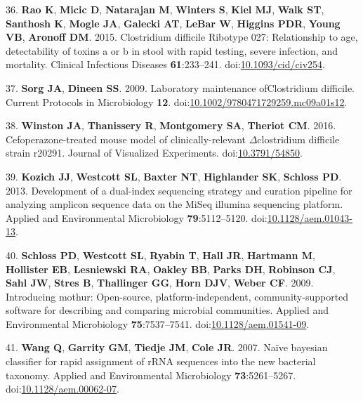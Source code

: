 \documentclass[11pt,]{article}
\newlength{\cslhangindent}
\newenvironment{cslreferences}%
  {\setlength{\parindent}{0pt}%
  \everypar{\setlength{\hangindent}{\cslhangindent}}\ignorespaces}%
  {\par}
\begin{document}
\begin{cslreferences}
\leavevmode\hypertarget{ref-rao2015}{}%
36. \textbf{Rao K}, \textbf{Micic D}, \textbf{Natarajan M},
\textbf{Winters S}, \textbf{Kiel MJ}, \textbf{Walk ST}, \textbf{Santhosh
K}, \textbf{Mogle JA}, \textbf{Galecki AT}, \textbf{LeBar W},
\textbf{Higgins PDR}, \textbf{Young VB}, \textbf{Aronoff DM}. 2015.
Clostridium difficile Ribotype 027: Relationship to age, detectability
of toxins a or b in stool with rapid testing, severe infection, and
mortality. Clinical Infectious Diseases \textbf{61}:233--241.
doi:\href{https://doi.org/10.1093/cid/civ254}{10.1093/cid/civ254}.

\leavevmode\hypertarget{ref-sorg2009}{}%
37. \textbf{Sorg JA}, \textbf{Dineen SS}. 2009. Laboratory maintenance
ofClostridium difficile. Current Protocols in Microbiology \textbf{12}.
doi:\href{https://doi.org/10.1002/9780471729259.mc09a01s12}{10.1002/9780471729259.mc09a01s12}.

\leavevmode\hypertarget{ref-winston2016}{}%
38. \textbf{Winston JA}, \textbf{Thanissery R}, \textbf{Montgomery SA},
\textbf{Theriot CM}. 2016. Cefoperazone-treated mouse model of
clinically-relevant \(\Delta\)clostridium difficile strain r20291.
Journal of Visualized Experiments.
doi:\href{https://doi.org/10.3791/54850}{10.3791/54850}.

\leavevmode\hypertarget{ref-kozich2013}{}%
39. \textbf{Kozich JJ}, \textbf{Westcott SL}, \textbf{Baxter NT},
\textbf{Highlander SK}, \textbf{Schloss PD}. 2013. Development of a
dual-index sequencing strategy and curation pipeline for analyzing
amplicon sequence data on the MiSeq illumina sequencing platform.
Applied and Environmental Microbiology \textbf{79}:5112--5120.
doi:\href{https://doi.org/10.1128/aem.01043-13}{10.1128/aem.01043-13}.

\leavevmode\hypertarget{ref-schloss2009}{}%
40. \textbf{Schloss PD}, \textbf{Westcott SL}, \textbf{Ryabin T},
\textbf{Hall JR}, \textbf{Hartmann M}, \textbf{Hollister EB},
\textbf{Lesniewski RA}, \textbf{Oakley BB}, \textbf{Parks DH},
\textbf{Robinson CJ}, \textbf{Sahl JW}, \textbf{Stres B},
\textbf{Thallinger GG}, \textbf{Horn DJV}, \textbf{Weber CF}. 2009.
Introducing mothur: Open-source, platform-independent,
community-supported software for describing and comparing microbial
communities. Applied and Environmental Microbiology
\textbf{75}:7537--7541.
doi:\href{https://doi.org/10.1128/aem.01541-09}{10.1128/aem.01541-09}.

\leavevmode\hypertarget{ref-wang2007}{}%
41. \textbf{Wang Q}, \textbf{Garrity GM}, \textbf{Tiedje JM},
\textbf{Cole JR}. 2007. Naïve bayesian classifier for rapid assignment
of rRNA sequences into the new bacterial taxonomy. Applied and
Environmental Microbiology \textbf{73}:5261--5267.
doi:\href{https://doi.org/10.1128/aem.00062-07}{10.1128/aem.00062-07}.


\end{cslreferences}
\end{document}
